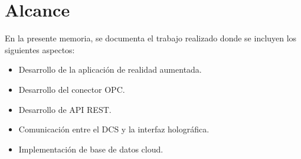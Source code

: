 
\section{Alcance}

En la presente memoria, se documenta el trabajo realizado donde se incluyen los siguientes aspectos:

\begin{itemize}	
\item Desarrollo de la aplicación de realidad aumentada.
\item Desarrollo del conector OPC.
\item Desarrollo de API REST.
\item Comunicación entre el DCS y la interfaz holográfica.
\item Implementación de base de datos cloud.
\end{itemize}